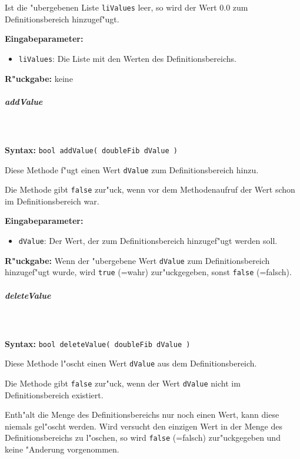 Ist die "ubergebenen Liste \verb|liValues| leer, so wird der Wert $0.0$ zum Definitionsbereich hinzugef"ugt.

\bigskip\noindent
\textbf{Eingabeparameter:}
\begin{itemize}
 \item \verb|liValues|: Die Liste mit den Werten des Definitionsbereichs.
\end{itemize}

\bigskip\noindent
\textbf{R"uckgabe:} keine


\subparagraph{addValue}

\ \\\\\noindent
\textbf{Syntax:} \verb|bool addValue( doubleFib dValue )|

\bigskip\noindent
Diese Methode f"ugt einen Wert \verb|dValue| zum Definitionsbereich hinzu.

Die Methode gibt \verb|false| zur"uck, wenn vor dem Methodenaufruf der Wert schon im Definitionsbereich war.

\bigskip\noindent
\textbf{Eingabeparameter:}
\begin{itemize}
 \item \verb|dValue|: Der Wert, der zum Definitionsbereich hinzugef"ugt werden soll.
\end{itemize}

\bigskip\noindent
\textbf{R"uckgabe:} Wenn der "ubergebene Wert \verb|dValue| zum  Definitionsbereich hinzugef"ugt wurde, wird \verb|true| (=wahr) zur"uckgegeben, sonst \verb|false| (=falsch).


\subparagraph{deleteValue}

\ \\\\\noindent
\textbf{Syntax:} \verb|bool deleteValue( doubleFib dValue )|

\bigskip\noindent
Diese Methode l"oscht einen Wert \verb|dValue| aus dem Definitionsbereich.

Die Methode gibt \verb|false| zur"uck, wenn der Wert \verb|dValue| nicht im Definitionsbereich existiert.

Enth"alt die Menge des Definitionsbereichs nur noch einen Wert, kann diese niemals gel"oscht werden. Wird versucht den einzigen Wert in der Menge des Definitionsbereichs zu l"oschen, so wird \verb|false| (=falsch) zur"uckgegeben und keine "Anderung vorgenommen.

